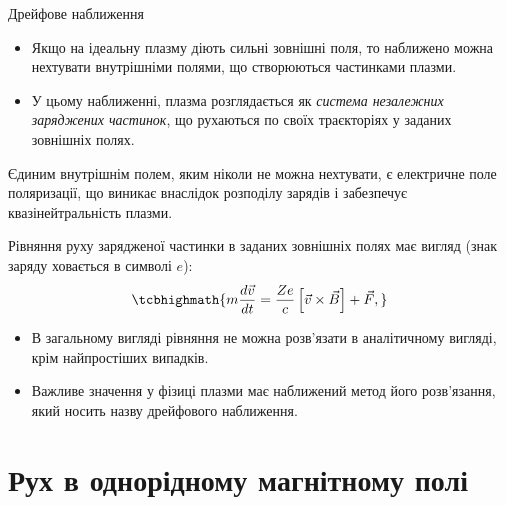\documentclass[]{beamer}
\begin{document}
\begin{frame}{Дрейфове наближення}{}
	\begin{overprint}
		\begin{itemize}\justifying
			\item Якщо на \alert{ідеальну плазму} діють \alert{сильні зовнішні поля}, то наближено можна \alert{нехтувати внутрішніми полями}, що створюються частинками плазми.
			\item  У цьому наближенні, плазма розглядається як \emph{система незалежних заряджених частинок}, що рухаються по своїх траєкторіях у заданих зовнішніх полях.
		\end{itemize}
		\begin{alertblock}{}\centering
			Єдиним внутрішнім полем, яким ніколи не можна нехтувати, є \alert{електричне поле поляризації}, що виникає внаслідок розподілу зарядів і забезпечує квазінейтральність плазми.
		\end{alertblock}
		Рівняння руху зарядженої частинки в заданих
		зовнішніх полях має вигляд (\alert{знак заряду ховається в символі $e$}):
		\begin{equation*}
			\tcbhighmath{%
				m \frac{d\vec{v}}{dt} = \frac{Ze}{c}\left[\vec{v}\times\vec{B}\right] + \vec{F},}
		\end{equation*}
		\begin{itemize}
			\item \alert{В загальному вигляді рівняння не можна розв'язати} в аналітичному вигляді, крім найпростіших випадків.
			\item Важливе значення у фізиці плазми має наближений метод його розв'язання, який носить назву \alert{дрейфового наближення}.
		\end{itemize}
	\end{overprint}
\end{frame}




\section{Рух в однорідному магнітному полі}
\end{document}
